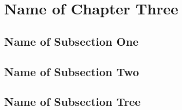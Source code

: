 \section{Name of Chapter Three}

\lipsum[4]

\subsection{Name of Subsection One}

\lipsum

\subsection{Name of Subsection Two}

\lipsum

\subsection{Name of Subsection Tree}

\lipsum
